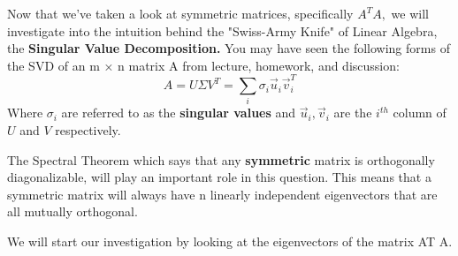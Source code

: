 


Now that we’ve taken a look at symmetric matrices, specifically $A^{T} A,$ we will investigate into the intuition behind the "Swiss-Army Knife" of Linear Algebra, the \textbf{Singular Value Decomposition.} You may have seen the following forms of the SVD of an m × n matrix A from lecture, homework, and discussion:
\begin{equation}
  A = U \Sigma V^{T} = \sum\limits_{i} \sigma_{i} \vec{u}_{i} \vec{v}_{i}^T
\end{equation}
Where $\sigma_{i}$ are referred to as the \textbf{singular values} and $\vec{u}_{i}, \vec{v}_{i}$ are the $i^{th}$ column of $U$ and $V$ respectively. 

The Spectral Theorem which says that any \textbf{symmetric} matrix is orthogonally diagonalizable, will play an important role in this question. 
This means that a symmetric matrix will always have n linearly independent eigenvectors that are all mutually orthogonal.

We will start our investigation by looking at the eigenvectors of the matrix AT A.

